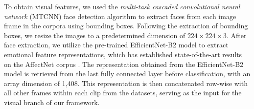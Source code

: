 \documentclass{article}
\begin{document}
To obtain visual features, we used the \emph{multi-task cascaded convolutional neural network} (MTCNN) face detection algorithm \cite{Zhang_2016_8} to extract faces from each image frame in the corpora using bounding boxes. Following the extraction of bounding boxes, we resize the images to a predetermined dimension of $224 \times 224 \times 3$. After face extraction, we utilize the pre-trained EfficientNet-B2 model \cite{savchenko_2022} to extract emotional feature representations, which has established state-of-the-art results on the AffectNet corpus \cite{Mollahosseini_2019}. The representation obtained from the EfficientNet-B2 model is retrieved from the last fully connected layer before classification, with an array dimension of 1,408. This representation is then concatenated row-wise with all other frames within each clip from the datasets, serving as the input for the visual branch of our framework.
\end{document}
